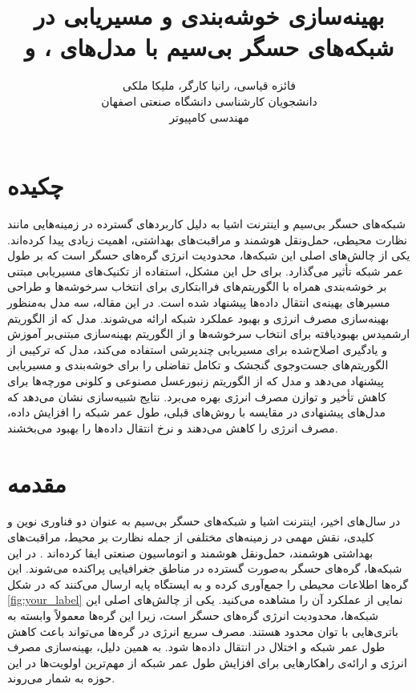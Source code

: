 \documentclass[12pt, onecolumn, a4paper]{article}
\begin{document}
	
	\title{بهینه‌سازی خوشه‌بندی و مسیریابی در شبکه‌های حسگر بی‌سیم با مدل‌های ،  و } 
	\author{فائزه قیاسی، رانیا کارگر، ملیکا ملکی\\
		دانشجویان کارشناسی دانشگاه صنعتی اصفهان\\
		مهندسی کامپیوتر}
	\date{}
	\maketitle
	\thispagestyle{empty}
	\vfill
	
	\section*{چکیده}
	شبکه‌های حسگر بی‌سیم و اینترنت اشیا به دلیل کاربردهای گسترده در زمینه‌هایی مانند نظارت محیطی، حمل‌ونقل هوشمند و مراقبت‌های بهداشتی، اهمیت زیادی پیدا کرده‌اند. یکی از چالش‌های اصلی این شبکه‌ها، محدودیت انرژی گره‌های حسگر است که بر طول عمر شبکه تأثیر می‌گذارد. برای حل این مشکل، استفاده از تکنیک‌های مسیریابی مبتنی بر خوشه‌بندی همراه با الگوریتم‌های فراابتکاری برای انتخاب سرخوشه‌ها و طراحی مسیرهای بهینه‌ی انتقال داده‌ها پیشنهاد شده است. در این مقاله، سه مدل به‌منظور بهینه‌سازی مصرف انرژی و بهبود عملکرد شبکه ارائه می‌شوند. مدل  که از الگوریتم ارشمیدس بهبودیافته برای انتخاب سرخوشه‌ها و از الگوریتم بهینه‌سازی مبتنی‌بر آموزش و یادگیری اصلاح‌شده برای مسیریابی چندپرشی استفاده می‌کند، مدل  که ترکیبی از الگوریتم‌های جست‌وجوی گنجشک و تکامل تفاضلی را برای خوشه‌بندی و مسیریابی پیشنهاد می‌دهد و مدل  که از الگوریتم زنبورعسل مصنوعی و کلونی مورچه‌ها برای کاهش تأخیر و توازن مصرف انرژی بهره می‌برد. نتایج شبیه‌سازی نشان می‌دهد که مدل‌های پیشنهادی در مقایسه با روش‌های قبلی، طول عمر شبکه را افزایش داده، مصرف انرژی را کاهش می‌دهند و نرخ انتقال داده‌ها را بهبود می‌بخشند. 
	
	\newpage
	
	\section{مقدمه}
	در سال‌های اخیر، اینترنت اشیا و شبکه‌های حسگر بی‌سیم به عنوان دو فناوری نوین و کلیدی، نقش مهمی در زمینه‌های مختلفی از جمله نظارت بر محیط، مراقبت‌های بهداشتی هوشمند، حمل‌ونقل هوشمند و اتوماسیون صنعتی ایفا کرده‌اند \cite{ref1, ref2, ref3}. در این شبکه‌ها، گره‌های حسگر به‌صورت گسترده در مناطق جغرافیایی پراکنده می‌شوند. این گره‌ها اطلاعات محیطی را جمع‌آوری کرده و به ایستگاه پایه ارسال می‌کنند که در شکل \ref{fig:your_label} نمایی از عملکرد آن را مشاهده می‌کنید. یکی از چالش‌های اصلی این شبکه‌ها، محدودیت انرژی گره‌های حسگر است، زیرا این گره‌ها معمولاً وابسته به باتری‌هایی با توان محدود هستند. مصرف سریع انرژی در گره‌ها می‌تواند باعث کاهش طول عمر شبکه و اختلال در انتقال داده‌ها شود. به همین دلیل، بهینه‌سازی مصرف انرژی و ارائه‌ی راهکارهایی برای افزایش طول عمر شبکه از مهم‌ترین اولویت‌ها در این حوزه به شمار می‌روند\cite{ref4, ref5}.
	
\end{document}
